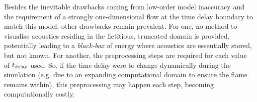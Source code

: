 Besides the inevitable drawbacks coming from low-order model inaccuracy and the requirement of a strongly one-dimensional flow at the time delay boundary to match this model, other drawbacks remain prevalent. For one, no method to visualise acoustics residing in the fictitious, truncated domain is provided, potentially leading to a \emph{black-box} of energy where acoustics are essentially stored, but not known. For another, the preprocessing steps are required for each value of $t_{\rm{delay}}$ used. So, if the time delay were to change dynamically during the simulation (e.g. due to an expanding computational domain to ensure the flame remains within), this preprocessing may happen each step, becoming computationally costly.





